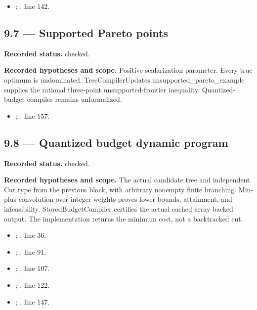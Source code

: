 \begin{itemize}
\item {}; , line 142.
\end{itemize}
\subsection{9.7 — Supported Pareto points}
\label{result:9.7}
\textbf{Recorded status.} checked.

\textbf{Recorded hypotheses and scope.} Positive scalarization parameter. Every true optimum is undominated. TreeCompilerUpdates.unsupported\_pareto\_example supplies the rational three-point unsupported-frontier inequality. Quantized-budget compiler remains unformalized.

\begin{itemize}
\item {}; , line 157.
\end{itemize}
\subsection{9.8 — Quantized budget dynamic program}
\label{result:9.8}
\textbf{Recorded status.} checked.

\textbf{Recorded hypotheses and scope.} The actual candidate tree and independent Cut type from the previous block, with arbitrary nonempty finite branching. Min-plus convolution over integer weights proves lower bounds, attainment, and infeasibility. StoredBudgetCompiler certifies the actual cached array-backed output. The implementation returns the minimum cost, not a backtracked cut.

\begin{itemize}
\item {}; , line 36.
\item {}; , line 91.
\item {}; , line 107.
\item {}; , line 122.
\item {}; , line 147.
\end{itemize}
